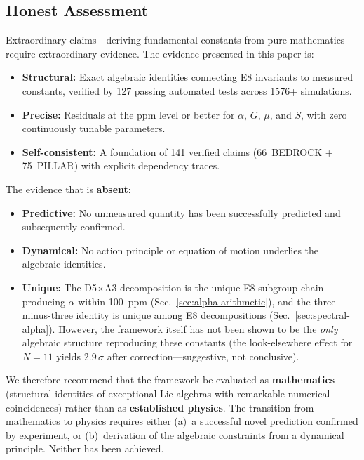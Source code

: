 \documentclass[aps,prd,twocolumn,superscriptaddress,floatfix,nofootinbib]{revtex4-2}
\theoremstyle{definition}
\theoremstyle{remark}
\begin{document}
\subsection{Honest Assessment}

Extraordinary claims---deriving fundamental constants from pure
mathematics---require extraordinary evidence.  The evidence presented
in this paper is:

\begin{itemize}
\item \textbf{Structural:} Exact algebraic identities connecting E8
      invariants to measured constants, verified by 127 passing automated
      tests across 1576+ simulations.

\item \textbf{Precise:} Residuals at the ppm level or better for
      $\alpha$, $G$, $\mu$, and $S$, with zero continuously tunable
      parameters.

\item \textbf{Self-consistent:} A foundation of 141 verified claims
      (66~BEDROCK + 75~PILLAR) with explicit dependency traces.
\end{itemize}

\noindent
The evidence that is \textbf{absent}:

\begin{itemize}
\item \textbf{Predictive:} No unmeasured quantity has been successfully
      predicted and subsequently confirmed.

\item \textbf{Dynamical:} No action principle or equation of motion
      underlies the algebraic identities.

\item \textbf{Unique:} The D5$\times$A3 decomposition is the unique
      E8 subgroup chain producing $\alpha$ within 100~ppm
      (Sec.~\ref{sec:alpha-arithmetic}), and the three-minus-three
      identity is unique among E8 decompositions
      (Sec.~\ref{sec:spectral-alpha}).  However, the framework itself
      has not been shown to be the \emph{only} algebraic structure
      reproducing these constants (the look-elsewhere effect for
      $N{=}11$ yields $2.9\,\sigma$ after correction---suggestive,
      not conclusive).
\end{itemize}

\noindent
We therefore recommend that the framework be evaluated as
\textbf{mathematics} (structural identities of exceptional Lie
algebras with remarkable numerical coincidences) rather than as
\textbf{established physics}.  The transition from mathematics to
physics requires either (a)~a successful novel prediction confirmed
by experiment, or (b)~derivation of the algebraic constraints from a
dynamical principle.  Neither has been achieved.
\end{document}
